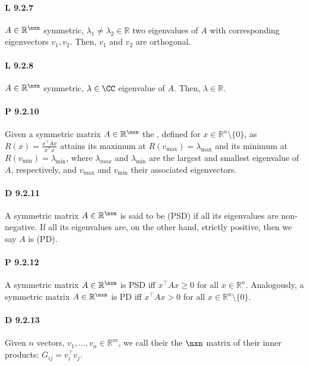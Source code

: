 \paragraph{L 9.2.7} $A\in\mathbb{R}^{\nxn}$ symmetric,
$\lambda_1\neq\lambda_2\in\mathbb{R}$ two eigenvalues of
$A$ with corresponding eigenvectors $v_1,v_2$. Then, $v_1$ and $v_2$ are orthogonal.

\paragraph{L 9.2.8} $A\in\mathbb{R}^{\nxn}$ symmetric, $\lambda\in\CC$ eigenvalue of $A$. Then, $\lambda\in\mathbb{R}$.

\paragraph{P 9.2.10} Given a symmetric matrix $A\in\mathbb{R}^{\nxn}$ the , defined for $x\in\mathbb{R}^n\setminus\{0\}$, as $R(x)=\frac{x^\top Ax}{x^\top x}$ attains its maximum at $R(v_{\max})=\lambda_{\max}$ and its minimum at $R(v_{\min})=\lambda_{\min}$, where $\lambda_{max}$ and $\lambda_{\min}$ are the largest and smallest eigenvalue of $A$, respectively, and $v_{\max}$ and $v_{\min}$ their associated eigenvectors.

\paragraph{D 9.2.11} A symmetric matrix $A\in\mathbb{R}^{\nxn}$
is said to be  (PSD) if all its eigenvalues are
non-negative. If all its eigenvalues are, on the other hand, strictly positive,
then we say $A$ is  (PD).

\paragraph{P 9.2.12} A symmetric matrix $A\in\mathbb{R}^{\nxn}$
is PSD iff $x^\top Ax\geq 0$ for all
$x\in\mathbb{R}^n$. Analogously, a symmetric matrix
$A\in\mathbb{R}^{\nxn}$ is PD iff $x^\top Ax>0$ for
all $x\in\mathbb{R}^n\setminus\{0\}$.

\paragraph{D 9.2.13} Given $n$ vectors,
$v_1,\dots,v_n\in\mathbb{R}^m$, we call their  the
$\nxn$ matrix of their inner products: $G_{ij} = v_i^\top v_j$.

